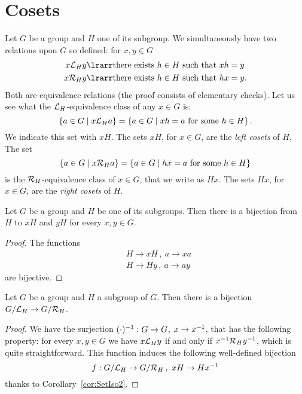 
\section{Cosets}

Let \(G\) be a group and \(H\) one of its subgroup. We simultaneously have two relations upon \(G\) so defined: for \(x, y \in G\)
\begin{align*}
x \call_H y & \lrarr \text{there exists } h \in H \text{ such that } xh = y \\
x \calr_H y & \lrarr \text{there exists } h \in H \text{ such that } hx = y .
\end{align*}
Both are equivalence relations (the proof consists of elementary checks). Let us see what the \(\mathcal L_H\)-equivalence class of any \(x \in G\) is:
\[\left\{a \in G \mid x \mathcal L_H a\right\} = \left\{a \in G \mid xh = a \text{ for some } h \in H\right\}.\]
We indicate this set with \(xH\). The sets \(xH\), for \(x \in G\), are the {\em left cosets} of \(H\). The set
\[\left\{a \in G \mid x \mathcal R_H a\right\} = \left\{a \in G \mid hx = a \text{ for some } h \in H\right\}\]
is the \(\mathcal R_H\)-equivalence class of \(x \in G\), that we write as \(Hx\). The sets \(Hx\), for \(x \in G\), are the {\em right cosets} of \(H\).

\begin{proposition}\label{prop:CosetsHaveTheSameCardinality}
Let \(G\) be a group and \(H\) be one of its subgroups. Then there is a bijection from \(H\) to \(xH\) and \(yH\) for every \(x, y \in G\).
\end{proposition}

\begin{proof}
The functions
\begin{align*}
& H \to xH\,, \ a \to xa \\
& H \to Hy\,, \ a \to ay
\end{align*}
are bijective.
\end{proof}

\begin{proposition}
Let \(G\) be a group and \(H\) a subgroup of \(G\). Then there is a bijection \(G/\mathcal L_H \to G/\mathcal R_H\).
\end{proposition}

\begin{proof}
We have the surjection \((\cdot)^{-1} : G \to G\), \(x \to x^{-1}\), that has the following property: for every \(x, y \in G\) we have \(x \mathcal L_H y\) if and only if \(x^{-1} \mathcal R_H y^{-1}\), which is quite straightforward. This function induces the following well-defined bijection
\[f : G/\call_H \to G/\calr_H\,, \ xH \to H\inv x\]
thanks to Corollary~\ref{cor:SetIso2}.
\end{proof}

